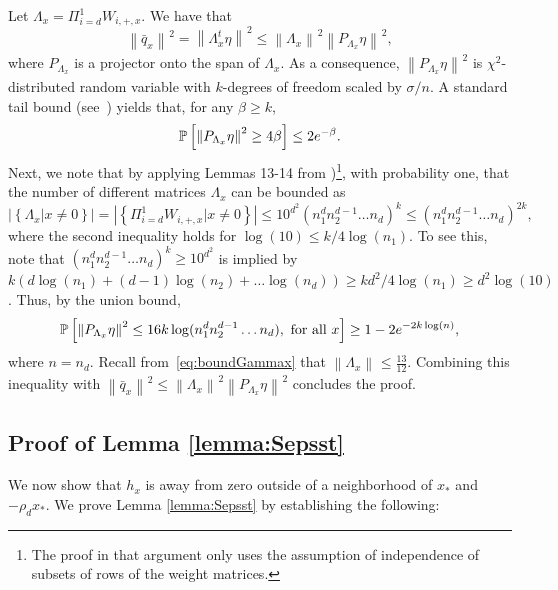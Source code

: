 \documentclass[11pt]{article}
\newcommand{\red}[1]{{\color{red} #1}}
\newcommand{\xo}{x_\ast}
\newcommand{\PiWd}{\Pi_{i=d}^1 W_{i,+,x}}
\newcommand{\hx}{h_x}
\newcommand{\Tnorm}{}
\newcommand\norm[2][\Tnorm]{\ensuremath{{\left\|#2\right\|}_{#1}}}
\newcommand\Tex{}
\newcommand\PR[2][\Tex]{
\ifthenelse{\equal{#1}{}}{{\mathbb P}\left[#2\right]}{\ensuremath{{\mathbb P}_{#1}\left[ #2\right]}}}
\newcommand\qbarx{\bar q_x}
\begin{document}
Let $\Lambda_x = \PiWd$.
We have that
\[
\norm{\qbarx}^2
=
\norm{ \Lambda_x^t \eta}^2
\leq
\norm{\Lambda_x}^2
\norm{ P_{\Lambda_x} \eta}^2,
\]
where $P_{\Lambda_x}$ is a projector onto the span of $\Lambda_x$.
As a consequence, $\norm{ P_{\Lambda_x} \eta}^2$ is $\chi^2$-distributed random variable with $k$-degrees of freedom scaled by $\sigma/n$. A standard tail bound (see~\cite[p.~43]{boucheron_concentration_2013}) yields that, for any $\beta \geq k$,
\[
\PR{\norm{ P_{\Lambda_x} \eta}^2 \geq 4 \beta}
\leq
2e^{-\beta}.
\]
Next, we note that by applying Lemmas 13-14 from \cite[Proof of Lem.~15]{hand_global_2017})\footnote{The proof in that argument only uses the assumption of independence of subsets of rows of the weight matrices.}, with probability one, that the number of different matrices $\Lambda_x$ can be bounded as
\[
|\left\{
\Lambda_x | x \neq 0
\right\}|
=
|\left\{
\PiWd | x \neq 0
\right\}|
\leq
10^{d^2}(n_1^d n_2^{d-1}\ldots n_d)^k
\leq
(n_1^d n_2^{d-1}\ldots n_d)^{2k},
\]
where the second inequality holds for
$\log(10) \leq k/4 \log(n_1)$.
To see this, note that
$(n_1^d n_2^{d-1}\ldots n_d)^{k} \geq 10^{d^2}$
is implied by
$k( d\log(n_1)+ (d-1) \log(n_2) + \ldots \log(n_d))
\geq k d^2/4 \log(n_1) \geq d^2 \log(10)$.
Thus, by the union bound,
\[
\PR{\norm{ P_{\Lambda_x} \eta}^2
\leq
16k\log(n_1^d n_2^{d-1}\ldots n_d),
\text{ for all $x$}
}
\geq
1 - 2e^{- 2 k\log (n)},
\]
where $n = n_d$.
Recall from~\eqref{eq:boundGammax} that $\norm{\Lambda_x} \leq \frac{13}{12}$.
Combining this inequality with
$\norm{\qbarx}^2
\leq
\norm{\Lambda_x}^2
\norm{ P_{\Lambda_x} \eta}^2$ concludes the proof.



\subsection{Proof of Lemma \ref{lemma:Sepsst} } \label{sec:zeros-hxxo}

We now show that $\hx$ is away from zero outside of a neighborhood of $\xo$ and $-\rho_d \xo$.  We prove Lemma \ref{lemma:Sepsst} by establishing the following:
\end{document}

